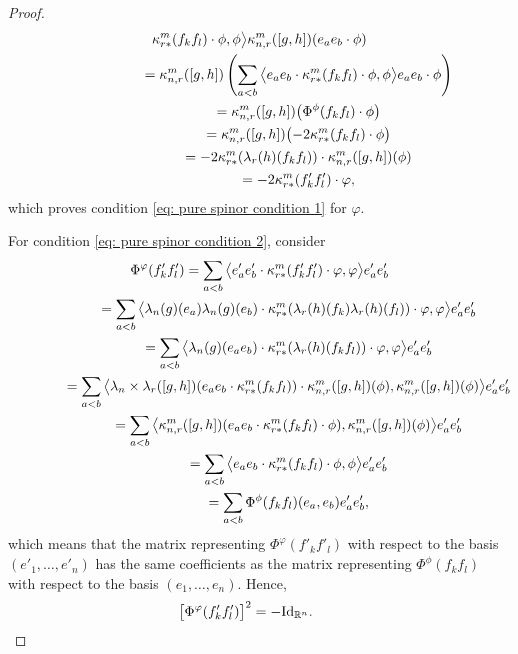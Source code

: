 \documentclass[pdftex]{sigma}
\numberwithin{equation}{section}
\begin{document}
\begin{proof}
{\begin{gather*}
\kappa_{r*}^m(f_kf_l)\cdot \phi,\phi\big\rangle
\kappa_{n,r}^m([g,h])(e_ae_b\cdot\phi)\\
\hphantom{\Phi^\varphi(f'_kf'_l) \cdot \varphi}{}
 = \kappa_{n,r}^m([g,h])\left(\sum_{a<b} \big\langle e_ae_b\cdot
\kappa_{r*}^m(f_kf_l)\cdot \phi,\phi\big\rangle
e_ae_b\cdot\phi\right)\\
\hphantom{\Phi^\varphi(f'_kf'_l) \cdot \varphi}{}
 = \kappa_{n,r}^m([g,h])\big(\Phi^\phi(f_kf_l)\cdot\phi\big)\\
 \hphantom{\Phi^\varphi(f'_kf'_l) \cdot \varphi}{}
 = \kappa_{n,r}^m([g,h])\big({-}2\kappa_{r*}^m(f_kf_l)\cdot\phi\big)\\
 \hphantom{\Phi^\varphi(f'_kf'_l) \cdot \varphi}{}
 = -2\kappa_{r*}^m(\lambda_r(h)(f_kf_l))\cdot\kappa_{n,r}^m([g,h])(\phi)\\
 \hphantom{\Phi^\varphi(f'_kf'_l) \cdot \varphi}{}
 = -2\kappa_{r*}^m(f'_kf'_l)\cdot\varphi,
\end{gather*}
which proves condition \eqref{eq: pure spinor condition 1} for $\varphi$.}

For condition \eqref{eq: pure spinor condition 2}, consider
\begin{gather*}
 \Phi^\varphi(f'_kf'_l) = \sum_{a<b} \big\langle e'_ae'_b\cdot \kappa_{r*}^m(f'_kf'_l)\cdot \varphi,\varphi\big\rangle e'_ae'_b\\
 \hphantom{\Phi^\varphi(f'_kf'_l)}{}= \sum_{a<b} \big\langle \lambda_n(g)(e_a)\lambda_n(g)(e_b)\cdot
\kappa_{r*}^m(\lambda_r(h)(f_k)\lambda_r(h)(f_l))\cdot \varphi,\varphi\big\rangle
e'_ae'_b\\
\hphantom{\Phi^\varphi(f'_kf'_l)}{} = \sum_{a<b} \big\langle \lambda_n(g)(e_ae_b)\cdot
\kappa_{r*}^m(\lambda_r(h)(f_kf_l))\cdot \varphi,\varphi\big\rangle e'_ae'_b\\
\hphantom{\Phi^\varphi(f'_kf'_l)}{} = \sum_{a<b} \big\langle \lambda_n\times\lambda_r([g,h])(e_ae_b\cdot
\kappa_{r*}^m(f_kf_l))\cdot \kappa_{n,r}^m([g,h])(\phi),\kappa_{n,r}^m([g,h])(\phi)\big\rangle e'_ae'_b\\
\hphantom{\Phi^\varphi(f'_kf'_l)}{} = \sum_{a<b} \big\langle \kappa_{n,r}^m([g,h])(e_ae_b\cdot
\kappa_{r*}^m(f_kf_l)\cdot \phi),\kappa_{n,r}^m([g,h])(\phi)\big\rangle e'_ae'_b\\
\hphantom{\Phi^\varphi(f'_kf'_l)}{} = \sum_{a<b} \big\langle e_ae_b\cdot \kappa_{r*}^m(f_kf_l)\cdot \phi,\phi\big\rangle e'_ae'_b\\
\hphantom{\Phi^\varphi(f'_kf'_l)}{} = \sum_{a<b} \Phi^\phi(f_kf_l)(e_a,e_b) e'_ae'_b,
\end{gather*}
which means that the matrix representing $\Phi^\varphi(f'_kf'_l)$ with respect to the basis $(e'_1,\dots,e'_n)$ has the same coefficients as the matrix representing $\Phi^\phi(f_kf_l)$ with respect to the basis $(e_1,\dots,e_n)$. Hence,
\begin{gather*}\big[\Phi^\varphi(f'_kf'_l)\big]^2=-{\rm Id}_{\mathbb{R}^n}.\tag*{\qed}\end{gather*}\renewcommand{\qed}{}
\end{proof}
\end{document}
